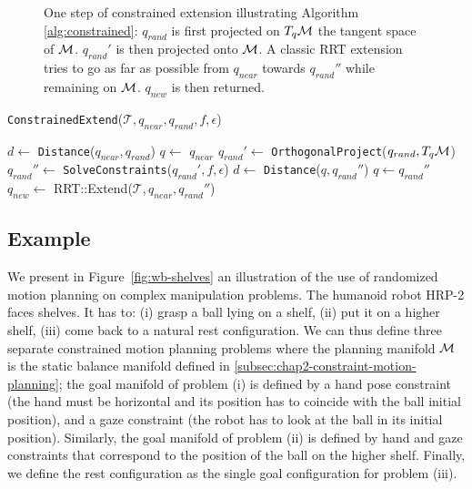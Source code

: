 \begin{figure}
\begin{minipage}[c]{0.3\linewidth}

\end{minipage}

\caption{One step of constrained extension illustrating Algorithm
  \ref{alg:constrained}: $q_{rand}$ is first projected on
  $T_q\mathcal{M}$ the tangent space of $\mathcal{M}$. $q_{rand}'$ is then
  projected onto $\mathcal{M}$. A classic RRT extension tries to go as
  far as possible from $q_{near}$ towards $q_{rand}''$ while remaining
  on $\mathcal{M}$. $q_{new}$ is then returned.}
\label{fig:gikrrt}
\end{figure}

\begin{algorithm}
  \caption{\texttt{ConstrainedExtend}($\mathcal{T},q_{near},q_{rand},f,\epsilon$)}
  \label{alg:constrained}
  \begin{algorithmic}
    \STATE $d \leftarrow$ \texttt{Distance}($q_{near}, q_{rand}$)
    \STATE $q \leftarrow$ $q_{near}$
    \STATE $q_{rand}' \leftarrow$ \texttt{OrthogonalProject}($q_{rand}, T_q\mathcal{M}$)
    \STATE $q_{rand}'' \leftarrow$ \texttt{SolveConstraints}($q_{rand}',f,\epsilon$)
    \STATE $d \leftarrow$ \texttt{Distance}($q,q_{rand}''$)
    \STATE $q \leftarrow q_{rand}''$
    \ENDWHILE
    \STATE $q_{new} \leftarrow$ RRT::Extend($\mathcal{T},q_{near},q_{rand}''$)
  \end{algorithmic}
\end{algorithm}
    
\subsection{Example}

We present in Figure~\ref{fig:wb-shelves} an illustration of the use
of randomized motion planning on complex manipulation problems. The
humanoid robot HRP-2 faces shelves. It has to: (i) grasp a ball lying
on a shelf, (ii) put it on a higher shelf, (iii) come back to a
natural rest configuration. We can thus define three separate
constrained motion planning problems where the planning manifold
$\mathcal{M}$ is the static balance manifold defined in
\ref{subsec:chap2-constraint-motion-planning}; the goal manifold of
problem (i) is defined by a hand pose constraint (the hand must be
horizontal and its position has to coincide with the ball initial
position), and a gaze constraint (the robot has to look at the ball in
its initial position). Similarly, the goal manifold of problem (ii) is
defined by hand and gaze constraints that correspond to the position
of the ball on the higher shelf. Finally, we define the rest
configuration as the single goal configuration for problem (iii).

